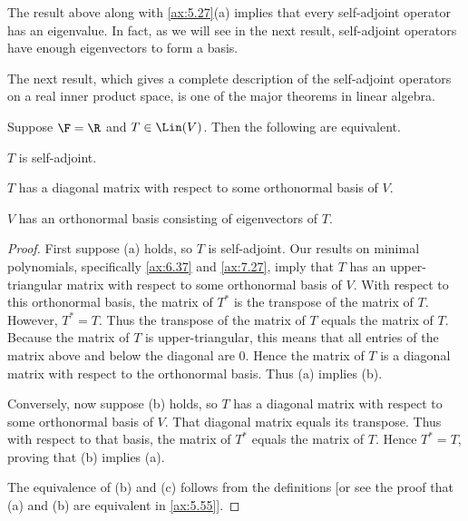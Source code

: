 The result above along with \ref{ax:5.27}(a) implies that every self-adjoint
operator has an eigenvalue. In fact, as we will see in the next result,
self-adjoint operators have enough eigenvectors to form a basis.

The next result, which gives a complete description of the self-adjoint
operators on a real inner product space, is one of the major theorems in linear
algebra.

\begin{result}\label{ax:7.29}
Suppose $\F=\R$ and $T\in\Lin(V)$. Then the following are equivalent.
\begin{parts}
\item $T$ is self-adjoint.
\item $T$ has a diagonal matrix with respect to some orthonormal basis of $V$.
\item $V$ has an orthonormal basis consisting of eigenvectors of $T$.
\end{parts}
\end{result}

\begin{proof}
First suppose (a) holds, so $T$ is self-adjoint. Our results on minimal
polynomials, specifically \ref{ax:6.37} and \ref{ax:7.27}, imply that $T$ has
an upper-triangular matrix with respect to some orthonormal basis of $V$. With
respect to this orthonormal basis, the matrix of $T^*$ is the transpose of the
matrix of $T$. However, $T^*=T$. Thus the transpose of the matrix of $T$ equals
the matrix of $T$. Because the matrix of $T$ is upper-triangular, this means
that all entries of the matrix above and below the diagonal are $0$. Hence the
matrix of $T$ is a diagonal matrix with respect to the orthonormal basis. Thus
(a) implies (b).

Conversely, now suppose (b) holds, so $T$ has a diagonal matrix with respect to
some orthonormal basis of $V$. That diagonal matrix equals its transpose. Thus
with respect to that basis, the matrix of $T^*$ equals the matrix of $T$. Hence
$T^*=T$, proving that (b) implies (a).

The equivalence of (b) and (c) follows from the definitions [or see the proof
that (a) and (b) are equivalent in \ref{ax:5.55}].
\end{proof}

